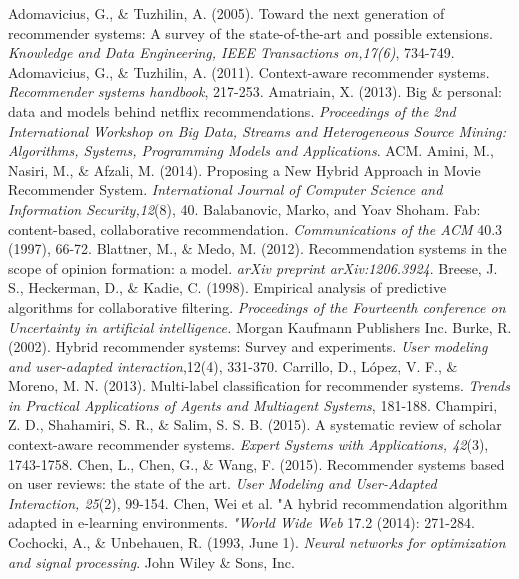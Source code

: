 \documentclass[12pt]{article}
\begin{document}
\begin{thebibliography}{100}  
 Adomavicius, G., \& Tuzhilin, A. (2005). Toward the next generation of recommender systems: A survey of the state-of-the-art and possible extensions. \textit{Knowledge and Data Engineering, IEEE Transactions on,17(6)}, 734-749.
 Adomavicius, G., \& Tuzhilin, A. (2011). Context-aware recommender systems. \textit{Recommender systems handbook}, 217-253.
 Amatriain, X. (2013). Big \& personal: data and models behind netflix recommendations. \textit{Proceedings of the 2nd International Workshop on Big Data, Streams and Heterogeneous Source Mining: Algorithms, Systems, Programming Models and Applications}. ACM.
 Amini, M., Nasiri, M., \& Afzali, M. (2014). Proposing a New Hybrid Approach in Movie Recommender System. \textit{International Journal of Computer Science and Information Security,12}(8), 40.
 Balabanovic, Marko, and Yoav Shoham. Fab: content-based, collaborative recommendation. \textit{Communications of the ACM} 40.3 (1997), 66-72.
 Blattner, M., \& Medo, M. (2012). Recommendation systems in the scope of opinion formation: a model. \textit{arXiv preprint arXiv:1206.3924}.
 Breese, J. S., Heckerman, D., \& Kadie, C. (1998). Empirical analysis of predictive algorithms for collaborative filtering. \textit{Proceedings of the Fourteenth conference on Uncertainty in artificial intelligence.} Morgan Kaufmann Publishers Inc.
 Burke, R. (2002). Hybrid recommender systems: Survey and experiments. \textit{User modeling and user-adapted interaction},12(4), 331-370.
 Carrillo, D., López, V. F., \& Moreno, M. N. (2013). Multi-label classification for recommender systems. \textit{Trends in Practical Applications of Agents and Multiagent Systems}, 181-188.
 Champiri, Z. D., Shahamiri, S. R., \& Salim, S. S. B. (2015). A systematic review of scholar context-aware recommender systems. \textit{Expert Systems with Applications, 42}(3), 1743-1758.
 Chen, L., Chen, G., \& Wang, F. (2015). Recommender systems based on user reviews: the state of the art. \textit{User Modeling and User-Adapted Interaction, 25}(2), 99-154.
 Chen, Wei et al. "A hybrid recommendation algorithm adapted in e-learning environments. \textit{"World Wide Web} 17.2 (2014): 271-284.
 Cochocki, A., \& Unbehauen, R. (1993, June 1). \textit{Neural networks for optimization and signal processing}. John Wiley \& Sons, Inc.

\end{thebibliography}
\end{document}
